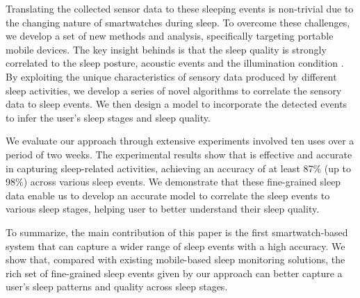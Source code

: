 Translating the collected sensor data to these sleeping events is non-trivial due to the changing nature of smartwatches during sleep. To
overcome these challenges, we develop a set of new methods and analysis, specifically targeting portable mobile devices.  The key insight
behinds {\systemname} is that the sleep quality is strongly correlated to the sleep posture, acoustic events and the illumination condition
\cite{shelgikar2016sleep}. By exploiting the unique characteristics of sensory data produced by different sleep activities, we develop a
series of novel algorithms to correlate the sensory data to sleep events. We then design a model to incorporate the detected events to
infer the user's sleep stages and sleep quality.%

We evaluate our approach through extensive experiments involved ten uses over a period of two weeks. The experimental results
show that {\systemname} is effective and accurate in capturing sleep-related activities, achieving an accuracy of at least 87\% (up to
98\%) across various sleep events. We demonstrate that these fine-grained sleep data enable us to develop an accurate model to correlate
the sleep events to various sleep stages, helping user to better understand their sleep quality. 

To summarize, the main contribution of this paper is the first smartwatch-based system that can capture a wider range of sleep events with a high
accuracy. We show that, compared with existing mobile-based sleep monitoring solutions, the rich set of fine-grained sleep events given by
our approach can better capture a user's sleep patterns and quality across sleep stages.
